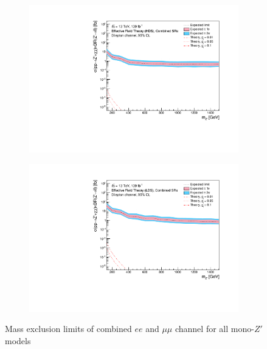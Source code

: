 \documentclass[12pt, a4paper]{book}
\begin{document}
\begin{figure}[!ht]
\begin{subfigure}[b]{0.49\textwidth}
      \includegraphics[width=1\textwidth]{Limits/Model_independent/EFT_HDS/mass_exclusion_comb.pdf}
   \end{subfigure}
   \hfill
   \begin{subfigure}[b]{0.49\textwidth}
      \centering
      \includegraphics[width=1\textwidth]{Limits/Model_independent/EFT_LDS/mass_exclusion_comb.pdf}
   \end{subfigure}
   \caption[Mass exclusion limits of combined $ee$ and $\mu\mu$ channel for all mono-$Z'$]{Mass exclusion limits of combined $ee$ and $\mu\mu$ channel for all mono-$Z'$ models}
\end{figure}
\end{document}
